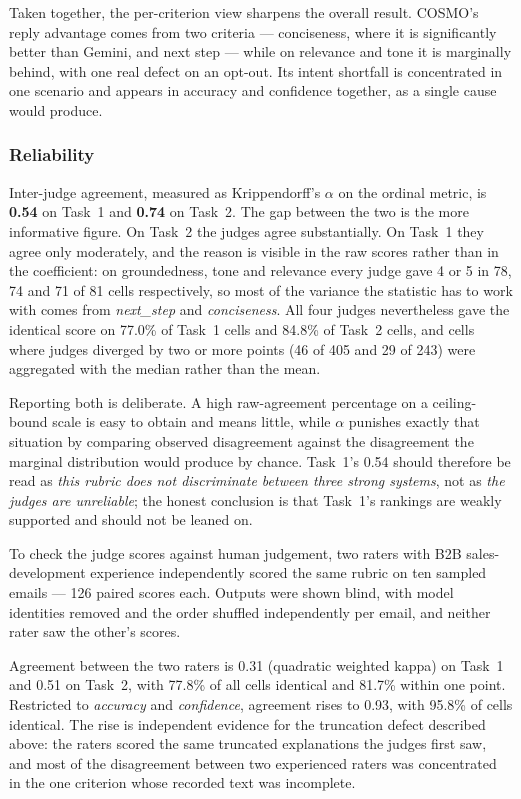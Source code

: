 \documentclass[a4paper]{article}
\begin{document}
Taken together, the per-criterion view sharpens the overall result. COSMO's
reply advantage comes from two criteria --- conciseness, where it is
significantly better than Gemini, and next step --- while on relevance and tone
it is marginally behind, with one real defect on an opt-out. Its intent
shortfall is concentrated in one scenario and appears in accuracy and confidence
together, as a single cause would produce.

\subsubsection{Reliability}
Inter-judge agreement, measured as Krippendorff's $\alpha$ on the ordinal
metric, is \textbf{0.54} on Task~1 and \textbf{0.74} on Task~2. The gap
between the two is the more informative figure. On Task~2 the judges agree
substantially. On Task~1 they agree only moderately, and the reason is visible
in the raw scores rather than in the coefficient: on groundedness, tone and
relevance every judge gave 4 or 5 in 78, 74 and 71 of 81 cells respectively,
so most of the variance the statistic has to work with comes from
\textit{next\_step} and \textit{conciseness}. All four judges nevertheless gave
the identical score on 77.0\% of Task~1 cells and 84.8\% of Task~2 cells, and
cells where judges diverged by two or more points (46 of 405 and 29 of 243)
were aggregated with the median rather than the mean.

Reporting both is deliberate. A high raw-agreement percentage on a
ceiling-bound scale is easy to obtain and means little, while $\alpha$
punishes exactly that situation by comparing observed disagreement against the
disagreement the marginal distribution would produce by chance. Task~1's 0.54
should therefore be read as \emph{this rubric does not discriminate between
three strong systems}, not as \emph{the judges are unreliable}; the honest
conclusion is that Task~1's rankings are weakly supported and should not be
leaned on.

To check the judge scores against human judgement, two raters with B2B
sales-development experience independently scored the same rubric on ten
sampled emails --- 126 paired scores each. Outputs were shown blind, with model
identities removed and the order shuffled independently per email, and neither
rater saw the other's scores.

Agreement between the two raters is 0.31 (quadratic weighted kappa) on Task~1
and 0.51 on Task~2, with 77.8\% of all cells identical and 81.7\% within one
point. Restricted to \textit{accuracy} and \textit{confidence}, agreement
rises to 0.93, with 95.8\% of cells identical. The rise is independent evidence
for the truncation defect described above: the raters scored the same
truncated explanations the judges first saw, and most of the disagreement
between two experienced raters was concentrated in the one criterion whose
recorded text was incomplete.
\end{document}

